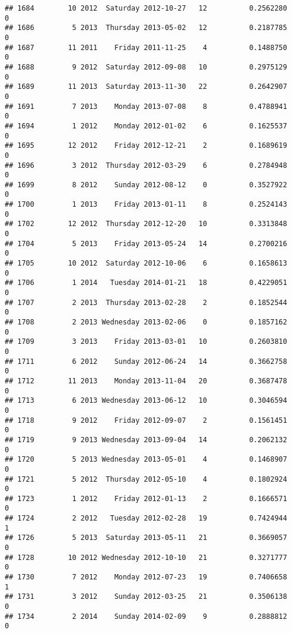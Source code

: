 \documentclass[
]{article}
\begin{document}
\begin{verbatim}
## 1684        10 2012  Saturday 2012-10-27   12          0.2562280             0
## 1686         5 2013  Thursday 2013-05-02   12          0.2187785             0
## 1687        11 2011    Friday 2011-11-25    4          0.1488750             0
## 1688         9 2012  Saturday 2012-09-08   10          0.2975129             0
## 1689        11 2013  Saturday 2013-11-30   22          0.2642907             0
## 1691         7 2013    Monday 2013-07-08    8          0.4788941             0
## 1694         1 2012    Monday 2012-01-02    6          0.1625537             0
## 1695        12 2012    Friday 2012-12-21    2          0.1689619             0
## 1696         3 2012  Thursday 2012-03-29    6          0.2784948             0
## 1699         8 2012    Sunday 2012-08-12    0          0.3527922             0
## 1700         1 2013    Friday 2013-01-11    8          0.2524143             0
## 1702        12 2012  Thursday 2012-12-20   10          0.3313848             0
## 1704         5 2013    Friday 2013-05-24   14          0.2700216             0
## 1705        10 2012  Saturday 2012-10-06    6          0.1658613             0
## 1706         1 2014   Tuesday 2014-01-21   18          0.4229051             0
## 1707         2 2013  Thursday 2013-02-28    2          0.1852544             0
## 1708         2 2013 Wednesday 2013-02-06    0          0.1857162             0
## 1709         3 2013    Friday 2013-03-01   10          0.2603810             0
## 1711         6 2012    Sunday 2012-06-24   14          0.3662758             0
## 1712        11 2013    Monday 2013-11-04   20          0.3687478             0
## 1713         6 2013 Wednesday 2013-06-12   10          0.3046594             0
## 1718         9 2012    Friday 2012-09-07    2          0.1561451             0
## 1719         9 2013 Wednesday 2013-09-04   14          0.2062132             0
## 1720         5 2013 Wednesday 2013-05-01    4          0.1468907             0
## 1721         5 2012  Thursday 2012-05-10    4          0.1802924             0
## 1723         1 2012    Friday 2012-01-13    2          0.1666571             0
## 1724         2 2012   Tuesday 2012-02-28   19          0.7424944             1
## 1726         5 2013  Saturday 2013-05-11   21          0.3669057             0
## 1728        10 2012 Wednesday 2012-10-10   21          0.3271777             0
## 1730         7 2012    Monday 2012-07-23   19          0.7406658             1
## 1731         3 2012    Sunday 2012-03-25   21          0.3506138             0
## 1734         2 2014    Sunday 2014-02-09    9          0.2888812             0

\end{verbatim}
\end{document}
